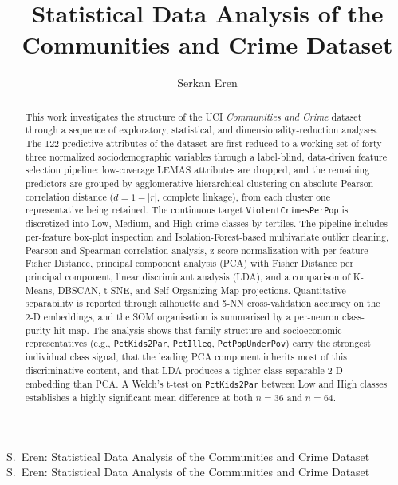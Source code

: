 \documentclass{ieeeaccess}
\begin{document}
\doi{}

\title{Statistical Data Analysis of the Communities and Crime Dataset}
\author{Serkan Eren}

\address[1]{Artificial Intelligence Graduate Program, Department of Computer Engineering, Faculty of Engineering, Gebze Technical University, Kocaeli, T\"urkiye}


\markboth
{S.~Eren: Statistical Data Analysis of the Communities and Crime Dataset}
{S.~Eren: Statistical Data Analysis of the Communities and Crime Dataset}


\begin{abstract}
This work investigates the structure of the UCI \emph{Communities and Crime} dataset through a sequence of exploratory, statistical, and dimensionality-reduction analyses. The 122 predictive attributes of the dataset are first reduced to a working set of forty-three normalized sociodemographic variables through a label-blind, data-driven feature selection pipeline: low-coverage LEMAS attributes are dropped, and the remaining predictors are grouped by agglomerative hierarchical clustering on absolute Pearson correlation distance ($d = 1 - |r|$, complete linkage), from each cluster one representative being retained. The continuous target \texttt{ViolentCrimesPerPop} is discretized into Low, Medium, and High crime classes by tertiles. The pipeline includes per-feature box-plot inspection and Isolation-Forest-based multivariate outlier cleaning, Pearson and Spearman correlation analysis, z-score normalization with per-feature Fisher Distance, principal component analysis (PCA) with Fisher Distance per principal component, linear discriminant analysis (LDA), and a comparison of K-Means, DBSCAN, t-SNE, and Self-Organizing Map projections. Quantitative separability is reported through silhouette and 5-NN cross-validation accuracy on the 2-D embeddings, and the SOM organisation is summarised by a per-neuron class-purity hit-map. The analysis shows that family-structure and socioeconomic representatives (e.g., \texttt{PctKids2Par}, \texttt{PctIlleg}, \texttt{PctPopUnderPov}) carry the strongest individual class signal, that the leading PCA component inherits most of this discriminative content, and that LDA produces a tighter class-separable 2-D embedding than PCA. A Welch's t-test on \texttt{PctKids2Par} between Low and High classes establishes a highly significant mean difference at both $n=36$ and $n=64$.
\end{abstract}
\end{document}
